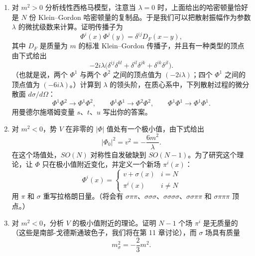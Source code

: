 \begin{enumerate}[label=(\alph*)]
  \item 对 $m^2>0$ 分析线性西格马模型，注意当 $\lambda=0$ 时，上面给出的哈密顿量恰好是 $N$ 份 Klein--Gordon 哈密顿量的复制品。于是我们可以把散射振幅作为参数 $\lambda$ 的微扰级数来计算。证明传播子为
    \begin{equation}
      \Phi^i(x)\Phi^j(y) = \delta^{ij}D_F(x-y) ,
    \end{equation}
    其中 $D_F$ 是质量为 $m$ 的标准 Klein--Gordon 传播子，并且有一种类型的顶点由下式给出
    \begin{equation}
      -2i\lambda\bigl( \delta^{ij}\delta^{kl} + \delta^{il}\delta^{jk}
        + \delta^{ik}\delta^{jl} \bigr) .
      \label{eq:4.vertex}
    \end{equation}
    （也就是说，两个 $\Phi^1$ 与两个 $\Phi^2$ 之间的顶点值为 $(-2i\lambda)$；四个 $\Phi^1$ 之间的顶点值为 $(-6i\lambda)$。）计算到 $\lambda$ 的领头阶，在质心系中，下列散射过程的微分散面 $d\sigma/d\Omega$：
    \begin{equation}
      \Phi^1\Phi^2 \to \Phi^1\Phi^2,
      \qquad \Phi^1\Phi^1 \to \Phi^2\Phi^2,
      \qquad \Phi^1\Phi^1 \to \Phi^1\Phi^1 .
    \end{equation}
    用曼德尔施塔姆变量 $s$、$t$、$u$ 写出你的答案。
  \item 对 $m^2<0$，势 $V$ 在非零的 $|\Phi|$ 值处有一个极小值，由下式给出
    \begin{equation}
      |\Phi_0|^2 = v^2 = -\frac{6m^2}{\lambda} .
    \end{equation}
    在这个场值处，$SO(N)$ 对称性自发破缺到 $SO(N-1)$。为了研究这个理论，让 $\Phi$ 只在极小值附近变化，并定义一个新场 $\pi^i(x)$：
    \begin{equation}
      \Phi^i(x) = \begin{cases}
        v + \sigma(x) & i = N\\
        \pi^i(x) & i \neq N
      \end{cases}
    \end{equation}
    用 $\pi$ 和 $\sigma$ 重写拉格朗日量。（将会有 $\sigma\pi\pi$、$\sigma\sigma\sigma$、$\sigma\sigma\sigma\sigma$、$\sigma\sigma\pi\pi$ 和 $\sigma\pi\pi\pi$ 顶点。）
  \item 对 $m^2 < 0$，分析 $V$ 的极小值附近的理论。证明 $N-1$ 个场 $\pi^i$ 是无质量的（这些是南部-戈德斯通玻色子，我们将在第 11 章讨论），而 $\sigma$ 场具有质量
    \begin{equation}
      m_\sigma^2 = -\frac{2}{3}m^2 .
    \end{equation}

\end{enumerate}
